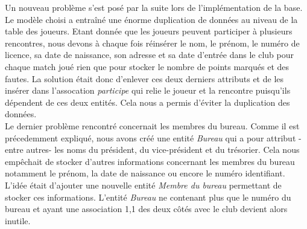 \documentclass{article}
\begin{document}
Un nouveau problème s'est posé par la suite lors de l'implémentation de la base. Le modèle choisi a entraîné une énorme duplication de données au niveau de la table des joueurs. Etant donnée que les joueurs peuvent participer à plusieurs rencontres, nous devons à chaque fois réinsérer le nom, le prénom, le numéro de licence, sa date de naissance, son adresse et sa date d'entrée dans le club pour chaque match joué rien que pour stocker le nombre de points marqués et des fautes. La solution était donc d'enlever ces deux derniers attributs et de les insérer dans l'assocation \textit{participe} qui relie le joueur et la rencontre puisqu'ils dépendent de ces deux entités. Cela nous a permis d'éviter la duplication des données.
\\


Le dernier problème rencontré concernait les membres du bureau. Comme il est précedemment expliqué, nous avons créé une entité \textit{Bureau} qui a pour attribut -entre autres- les noms du président, du vice-président et du trésorier. Cela nous empêchait de stocker d'autres informations concernant les membres du bureau notamment le prénom, la date de naissance ou encore le numéro identifiant. L'idée était d'ajouter une nouvelle entité \textit{Membre du bureau} permettant de stocker ces informations. L'entité \textit{Bureau} ne contenant plus que le numéro du bureau et ayant une association 1,1 des deux côtés avec le club devient alors inutile.  
\end{document}
